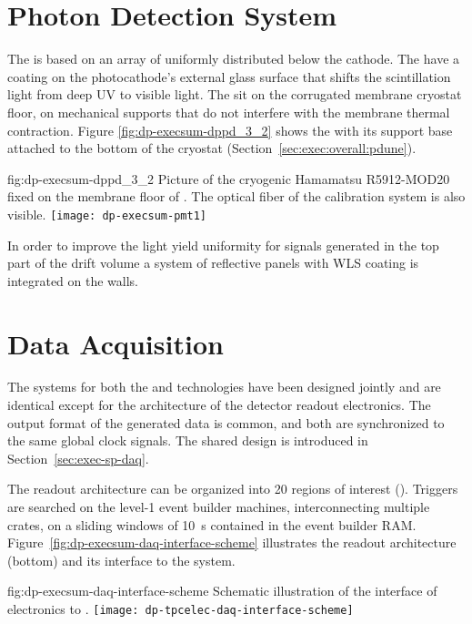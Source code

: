 \section{Photon Detection System}
\label{sec:dp-execsum-pd}

The  is based on an array of  uniformly distributed below the cathode. 
The  have a  coating on the photocathode's external glass surface that shifts the scintillation light from deep UV to visible light. The   sit on the corrugated membrane cryostat floor, on 
mechanical supports that do not interfere with the membrane thermal contraction. 
Figure \ref{fig:dp-execsum-dppd_3_2} shows the  with its support base attached to the bottom of the  cryostat (Section~\ref{sec:exec:overall:pdune}).

\begin{dunefigure}{fig:dp-execsum-dppd_3_2}
{Picture of the cryogenic Hamamatsu R5912-MOD20  fixed on the membrane floor of . The optical fiber of the calibration system is also visible.}
\texttt{[image: dp-execsum-pmt1]}
\end{dunefigure}

In order to improve the light yield uniformity for signals generated in the top part of the drift volume a system of reflective panels with WLS coating is integrated on the   walls.


\section{Data Acquisition}
\label{sec:dp-execsum-daq}

The  systems for both the  and  technologies have been designed jointly and are identical except for the architecture of the detector readout electronics.  The output format of the generated data is common, and both are synchronized to the same global clock signals. The shared  design is introduced in Section~\ref{sec:exec-sp-daq}.

The  readout architecture can be organized into \num{20} regions of interest (). %
Triggers are searched on the level-1 event builder machines, interconnecting multiple  crates, on a sliding windows of \SI{10}{s} contained in the event builder RAM.
Figure~\ref{fig:dp-execsum-daq-interface-scheme} illustrates the  readout architecture (bottom) and its interface to the  system.
  

\begin{dunefigure}{fig:dp-execsum-daq-interface-scheme}
{Schematic illustration of the interface of   electronics to .}
\texttt{[image: dp-tpcelec-daq-interface-scheme]}
\end{dunefigure}

